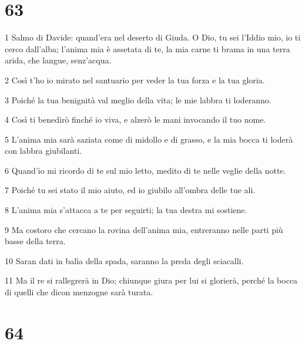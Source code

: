 \chapter{63}

\par 1 Salmo di Davide: quand'era nel deserto di Giuda. O Dio, tu sei l'Iddio mio, io ti cerco dall'alba; l'anima mia è assetata di te, la mia carne ti brama in una terra arida, che langue, senz'acqua.
\par 2 Così t'ho io mirato nel santuario per veder la tua forza e la tua gloria.
\par 3 Poiché la tua benignità val meglio della vita; le mie labbra ti loderanno.
\par 4 Così ti benedirò finché io viva, e alzerò le mani invocando il tuo nome.
\par 5 L'anima mia sarà saziata come di midollo e di grasso, e la mia bocca ti loderà con labbra giubilanti.
\par 6 Quand'io mi ricordo di te sul mio letto, medito di te nelle veglie della notte.
\par 7 Poiché tu sei stato il mio aiuto, ed io giubilo all'ombra delle tue ali.
\par 8 L'anima mia s'attacca a te per seguirti; la tua destra mi sostiene.
\par 9 Ma costoro che cercano la rovina dell'anima mia, entreranno nelle parti più basse della terra.
\par 10 Saran dati in balìa della spada, saranno la preda degli sciacalli.
\par 11 Ma il re si rallegrerà in Dio; chiunque giura per lui si glorierà, perché la bocca di quelli che dicon menzogne sarà turata.

\chapter{64}

